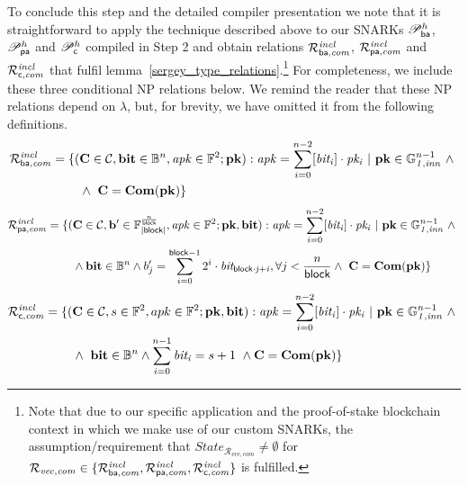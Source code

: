 \noindent To conclude this step and the detailed compiler presentation we note that it is straightforward to apply the technique 
described above to our SNARKs $\mathscr{P}_{\mathsf{ba}}^{h}$, $\mathscr{P}_{\mathsf{pa}}^{h}$ and $\mathscr{P}_{\mathsf{c}}^{h}$ 
compiled in Step 2 and obtain relations $\mathcal{R}^{\mathit{incl}}_{\mathsf{ba},\mathit{com}}$, $\mathcal{R}^{\mathit{incl}}_{\mathsf{pa},\mathit{com}}$ 
and $\mathcal{R}^{\mathit{incl}}_{\mathsf{c},\mathit{com}}$ that fulfil lemma~\ref{sergey_type_relations}.\footnote{Note that due to our specific application 
and the proof-of-stake blockchain context in which we make use of our custom SNARKs, 
the assumption/requirement that  $\mathit{State}_{\mathcal{R}_{\mathit{vec}, \mathit{com}}} \neq \emptyset$ for 
$\mathcal{R}_{\mathit{vec}, \mathit{com}} \in \{\mathcal{R}^{\mathit{incl}}_{\mathsf{ba},\mathit{com}}, \mathcal{R}^{\mathit{incl}}_{\mathsf{pa},\mathit{com}}, \mathcal{R}^{\mathit{incl}}_{\mathsf{c},\mathit{com}}\}$ is fulfilled.}
For completeness, we include these three conditional NP relations below. We remind the reader that these NP relations depend on $\lambda$, 
but, for brevity, we have omitted it from the following definitions.  
\begin{align*}
{\mathcal{R}^{\mathit{incl}}_{\mathsf{ba},\mathit{com}}} = \{(&\mathbf{C} \in \mathcal{C}, \mathbf{bit} \in \mathbb{B}^n, \mathit{apk} \in \mathbb{F}^2; \mathbf{pk}) : 
\mathit{apk} = \sum_{i=0}^{n-2} [\mathit{bit_i}] \cdot \mathit{pk_i} \ | \ \mathbf{pk} \in \mathbb{G}_{\mathit{1,inn}}^{n-1} \ \wedge \ \\
& \wedge \  \mathbf{C} = \mathbf{Com}(\mathbf{pk}) \} 
\end{align*}
\vspace*{-0.75cm}
\begin{align*}
{\mathcal{R}^{\mathit{incl}}_{\mathsf{pa},\mathit{com}}}  = \{(&\mathbf{C} \in \mathcal{C}, \mathbf{b'} \in \mathbb{F}_{|\mathsf{block}|}^{\frac{n}{\mathsf{block}}}, \mathit{apk} \in \mathbb{F}^2;\mathbf{pk}, \mathbf{bit}) : 
\mathit{apk} = \sum_{i=0}^{n-2} [\mathit{bit_i}] \cdot \mathit{pk_i} \ | \ \mathbf{pk} \in \mathbb{G}_{\mathit{1,inn}}^{n-1} \ \wedge \ \\
& \wedge \mathbf{bit} \in \mathbb{B}^n  \wedge b'_{j} = \sum_{i=0}^{\mathsf{block} -1}2^i \cdot \mathit{bit_{\mathsf{block} \cdot j + i}}, \forall j < \frac{n}{\mathsf{block}}  \wedge \  \mathbf{C} = \mathbf{Com}(\mathbf{pk}) \} 
\end{align*}
\vspace*{-0.75cm}
\begin{align*}
{\mathcal{R}^{\mathit{incl}}_{\mathsf{c},\mathit{com}}} = \{(&\mathbf{C} \in \mathcal{C}, s \in \mathbb{F}^2, apk \in \mathbb{F}^2 ; \mathbf{pk}, \mathbf{bit}) : 
\mathit{apk} = \sum_{i=0}^{n-2} [\mathit{bit_i}] \cdot \mathit{pk_i} \ | \ \mathbf{pk} \in \mathbb{G}_{\mathit{1,inn}}^{n-1} \ \wedge \ \\
& \wedge \ \mathbf{bit} \in \mathbb{B}^n  \wedge  \sum_{i=0}^{n-1} \mathit{bit_i} = s+1 \ \wedge \mathbf{C} = \mathbf{Com}(\mathbf{pk}) \}
\end{align*}
\vspace*{-0.75cm}

